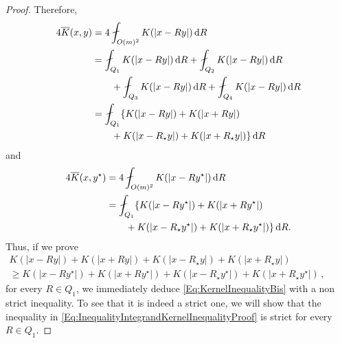 \begin{proof}
Therefore,
\begin{align*}
4\overline{K} (x, y) &= 4\average_{O(m)^2} K(|x - R y|)\d R \\
& = \average_{Q_1} K(|x - R y|)\d R + \average_{Q_2} K(|x - R y|)\d R \\
& \quad \quad
+ \average_{Q_3} K(|x - R y|)\d R +
\average_{Q_4} K(|x - R y|)\d R \\
&= \average_{Q_1} \{K(|x - R y|) + K(|x + R y|) \\
&\quad \quad + K(|x - R_\star y|) + K(|x + R_\star y|)\}\d R
\end{align*}
and
\begin{align*}
4\overline{K} (x, y^\star) &= 4\average_{O(m)^2} K(|x - R y^\star|)\d R \\
& = \average_{Q_1} \{K(|x - R y^\star|) + K(|x + R y^\star|) \\
&\quad \quad + K(|x - R_\star y^\star|) + K(|x + R_\star y^\star|)\}\d R.
\end{align*}
Thus, if we prove
\begin{equation}
\label{Eq:InequalityIntegrandKernelInequalityProof}
\begin{split}
K(|x - R y|) + K(|x + R y|) + K(|x - R_\star y|) + K(|x + R_\star y|)
\quad \quad \quad \quad \quad \quad \quad \quad
\\
\geq
K(|x - R y^\star|) + K(|x + R y^\star|)+K(|x - R_\star y^\star|) + K(|x + R_\star y^\star|)\,,
\end{split}
\end{equation}
for every $R\in Q_1$, we immediately deduce \eqref{Eq:KernelInequalityBis} with a non strict inequality. To see that it is indeed a strict one, we will show that the inequality in \eqref{Eq:InequalityIntegrandKernelInequalityProof} is strict for every $R \in Q_1$.



\end{proof}
